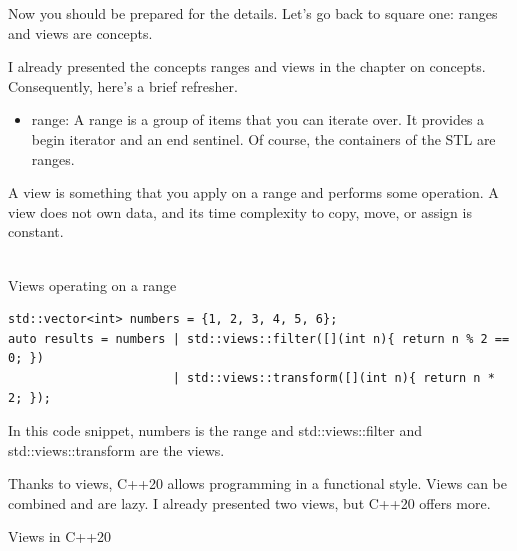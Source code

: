 Now you should be prepared for the details. Let’s go back to square one: ranges and views are concepts.


I already presented the concepts ranges and views in the chapter on concepts. Consequently, here’s a brief refresher.

\begin{itemize}
\item 
range: A range is a group of items that you can iterate over. It provides a begin iterator and an end sentinel. Of course, the containers of the STL are ranges.
\end{itemize}

A view is something that you apply on a range and performs some operation. A view does not own data, and its time complexity to copy, move, or assign is constant.

\hspace*{\fill} \\ %
\noindent
Views operating on a range
\begin{lstlisting}[style=styleCXX]
std::vector<int> numbers = {1, 2, 3, 4, 5, 6};
auto results = numbers | std::views::filter([](int n){ return n % 2 == 0; })
                       | std::views::transform([](int n){ return n * 2; });
\end{lstlisting}

In this code snippet, numbers is the range and std::views::filter and std::views::transform are the views.

Thanks to views, C++20 allows programming in a functional style. Views can be combined and are lazy. I already presented two views, but C++20 offers more.


\begin{center}
Views in C++20
\end{center}


